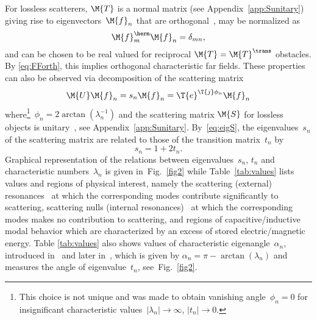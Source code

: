 \documentclass[journal]{IEEEtran}
\providecommand{\Smat}{\M{U}} %
\begin{document}
For lossless scatterers, $\M{T}$ is a normal matrix (see Appendix~\ref{app:Sunitary}) giving rise to eigenvectors~$\M{f}_n$ that are orthogonal~\cite{GarbaczTurpin_AGeneralizedExpansionForRadiatedAndScatteredFields}, may be normalized as
\begin{equation}
\M{f}_m^\herm \M{f}_n = \delta_{mn},
\label{eq:fforto}
\end{equation}
and can be chosen to be real valued for reciprocal $\M{T} = \M{T}^{\trans}$ obstacles.  By \eqref{eq:FForth}, this implies orthogonal characteristic far fields. These properties can also be observed via decomposition of the scattering matrix
\begin{equation}
\label{eq:eigS}
 \Smat \M{f}_n = s_n  \M{f}_n  = \T{e}^{\T{j} \phi_n} \M{f}_n   
\end{equation}
where\footnote{This choice is not unique and was made to obtain vanishing angle~$\phi_n = 0$ for insignificant characteristic values~$\left| \lambda_n\right| \to \infty$, $\left| t_n\right| \to 0$.}~$\phi_n = 2\arctan(\lambda_n^{-1})$ and the scattering matrix $\M{S}$ for lossless objects is unitary~\cite[Chap.~4]{Collin_FoundationsForMicrowaveEngineering}, see Appendix~\ref{app:Sunitary}. By~\eqref{eq:eigS}, the eigenvalues~$s_n$ of the scattering matrix are related to those of the transition matrix~$t_n$ by
\begin{equation}
\label{eq:sntnRelation}
s_n = 1 + 2 t_n.
\end{equation}
Graphical representation of the relations between eigenvalues~$s_n$, $t_n$ and characteristic numbers~$\lambda_n$ is given in~Fig.~\ref{fig2} while Table~\ref{tab:values} lists values and regions of physical interest, namely the scattering (external) resonances~\cite{GarbaczTurpin_AGeneralizedExpansionForRadiatedAndScatteredFields} at which the corresponding modes contribute significantly to scattering, scattering nulls (internal resonances)~\cite{GarbaczTurpin_AGeneralizedExpansionForRadiatedAndScatteredFields} at which the corresponding modes makes no contribution to scattering, and regions of capacitive/inductive modal behavior which are characterized by an excess of stored electric/magnetic energy. Table \ref{tab:values} also shows values of characteristic eigenangle~$\alpha_n$, introduced in~\cite{GarbaczTurpin_AGeneralizedExpansionForRadiatedAndScatteredFields} and later in~\cite{Newman_SmallAntennaLocationSynthesisUsingCharacteristicModes}, which is given by $\alpha_n = \pi - \arctan \left(\lambda_n \right)$ and measures the angle of eigenvalue~$t_n$, see~Fig.~\ref{fig2}.
\end{document}
